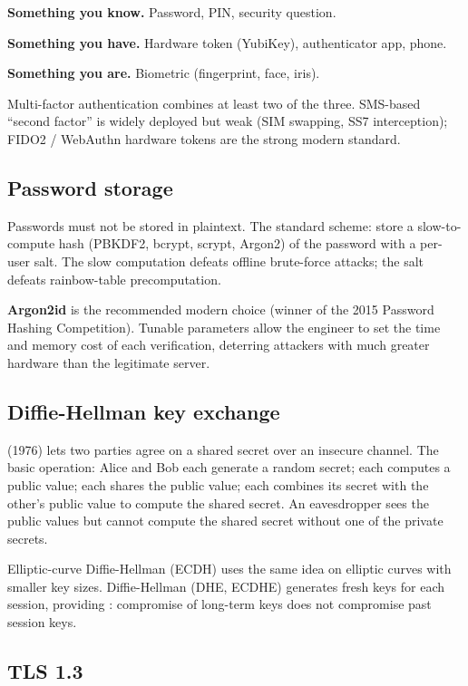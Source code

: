 \textbf{Something you know.} Password, PIN, security question.

\textbf{Something you have.} Hardware token (YubiKey), authenticator app, phone.

\textbf{Something you are.} Biometric (fingerprint, face, iris).

Multi-factor authentication combines at least two of the three. SMS-based ``second factor'' is widely deployed but weak (SIM swapping, SS7 interception); FIDO2 / WebAuthn hardware tokens are the strong modern standard.

\subsection{Password storage}

Passwords must not be stored in plaintext. The standard scheme: store a slow-to-compute hash (PBKDF2, bcrypt, scrypt, Argon2) of the password with a per-user salt. The slow computation defeats offline brute-force attacks; the salt defeats rainbow-table precomputation.

\textbf{Argon2id} is the recommended modern choice (winner of the 2015 Password Hashing Competition). Tunable parameters allow the engineer to set the time and memory cost of each verification, deterring attackers with much greater hardware than the legitimate server.

\subsection{Diffie-Hellman key exchange}

 (1976) lets two parties agree on a shared secret over an insecure channel. The basic operation: Alice and Bob each generate a random secret; each computes a public value; each shares the public value; each combines its secret with the other's public value to compute the shared secret. An eavesdropper sees the public values but cannot compute the shared secret without one of the private secrets.

Elliptic-curve Diffie-Hellman (ECDH) uses the same idea on elliptic curves with smaller key sizes.  Diffie-Hellman (DHE, ECDHE) generates fresh keys for each session, providing : compromise of long-term keys does not compromise past session keys.

\subsection{TLS 1.3}

